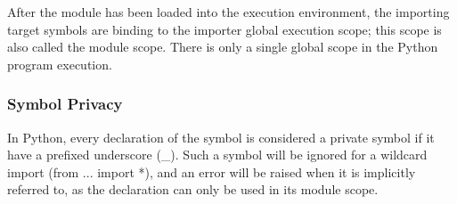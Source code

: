 After the module has been loaded into the execution environment, the importing target symbols are binding to the importer global execution scope; this scope is also called the module scope. There is only a single global scope in the Python program execution.

\subsubsection{Symbol Privacy}

In Python, every declaration of the symbol is considered a private symbol if it have a prefixed underscore (\_). Such a symbol will be ignored for a wildcard import (from ... import *), and an error will be raised when it is implicitly referred to, as the declaration can only be used in its module scope.
